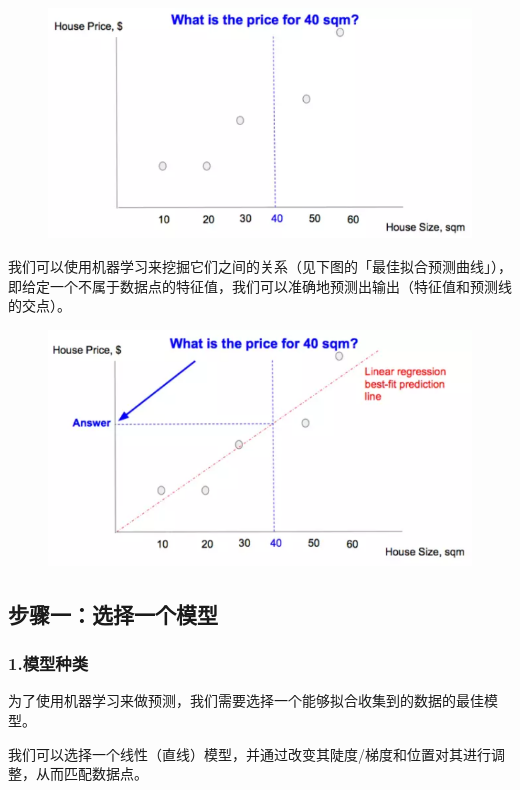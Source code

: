 \documentclass[11pt]{book} %
\begin{document}
\begin{figure}
\centering
\includegraphics[width=\linewidth]{figures/tensorflow_sample_data_question}
\caption{}
\label{fig_tensorflow_sample_data_question}
\end{figure}

我们可以使用机器学习来挖掘它们之间的关系（见下图的「最佳拟合预测曲线」），即给定一个不属于数据点的特征值，我们可以准确地预测出输出（特征值和预测线的交点）。

\begin{figure}
\centering
\includegraphics[width=0.7\linewidth]{figures/best_fit_prediction_line}
\caption{}
\label{fig:bestfitpredictionline}
\end{figure}


\subsection{步骤一：选择一个模型}

\subsubsection{1.模型种类}

为了使用机器学习来做预测，我们需要选择一个能够拟合收集到的数据的最佳模型。

我们可以选择一个线性（直线）模型，并通过改变其陡度/梯度和位置对其进行调整，从而匹配数据点。
\end{document}
